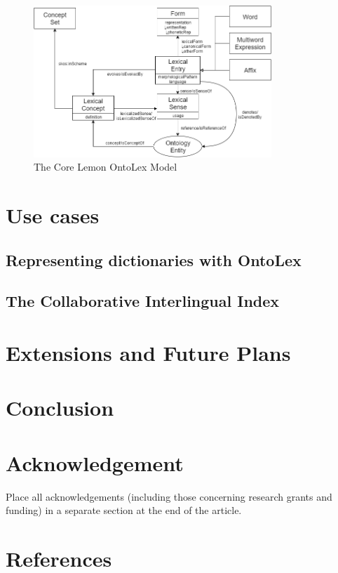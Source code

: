 \documentclass[12pt,a4paper]{elex2017}
\begin{document}
\begin{figure}
\includegraphics[width=0.8\textwidth]{Lemon_OntoLex_Core.png}
\caption{\label{fig:core}The Core Lemon OntoLex Model}
\end{figure}



\section{Use cases}

\subsection{Representing dictionaries with OntoLex}

\subsection{The Collaborative Interlingual Index}

\section{Extensions and Future Plans}

\section{Conclusion}

\section*{Acknowledgement} 

Place all acknowledgements (including those concerning research grants and
funding) in a separate section at the end of the article.

\section*{References}
\end{document}
